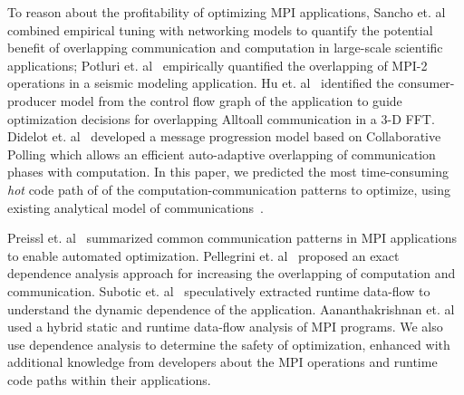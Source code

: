 To reason about the profitability of optimizing MPI applications,
 Sancho et. al~\cite{sancho:sc06} combined empirical tuning with networking models
    to quantify the potential benefit of overlapping communication and computation in large-scale scientific applications;
  Potluri et. al~\cite{potluri:ics10} empirically quantified the overlapping of MPI-2 operations in a seismic modeling application.
  Hu et. al~\cite{hu:npc08,song:ppopp14} identified the consumer-producer model from the control flow graph of the application to guide optimization decisions  for overlapping Alltoall communication in a 3-D FFT.
Didelot et. al~\cite{didelot:imc14,didelot:eurompi12} developed a message progression model based on Collaborative Polling which allows an efficient auto-adaptive overlapping of communication phases with computation.
In this paper, we predicted the most time-consuming \emph{hot} code path of of the computation-communication patterns to optimize, using existing analytical model of communications~\cite{loggp}.


Preissl et. al~\cite{preissl:tms10} summarized common communication patterns in MPI applications to enable automated optimization.
Pellegrini et. al~\cite{pellegrini:eurompi12} proposed an exact dependence analysis approach for increasing the overlapping of computation and communication.
Subotic et. al~\cite{subotic:hipeac08} speculatively extracted runtime data-flow to understand the dynamic dependence of the application.
Aananthakrishnan et. al~\cite{aananthakrishnan:ics13} used a hybrid  static and runtime data-flow analysis of MPI programs.
We also use dependence analysis to determine the safety of optimization, enhanced with additional knowledge from developers
about the MPI operations and runtime code paths within their applications.

